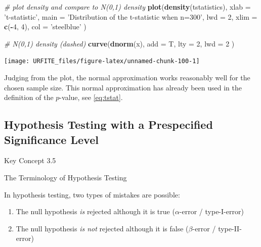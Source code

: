 \documentclass[]{book}
\newenvironment{Shaded}{\begin{snugshade}}{\end{snugshade}}
\newcommand{\KeywordTok}[1]{\textcolor[rgb]{0.13,0.29,0.53}{\textbf{#1}}}
\newcommand{\DataTypeTok}[1]{\textcolor[rgb]{0.13,0.29,0.53}{#1}}
\newcommand{\DecValTok}[1]{\textcolor[rgb]{0.00,0.00,0.81}{#1}}
\newcommand{\StringTok}[1]{\textcolor[rgb]{0.31,0.60,0.02}{#1}}
\newcommand{\CommentTok}[1]{\textcolor[rgb]{0.56,0.35,0.01}{\textit{#1}}}
\newcommand{\OperatorTok}[1]{\textcolor[rgb]{0.81,0.36,0.00}{\textbf{#1}}}
\newcommand{\NormalTok}[1]{#1}
\theoremstyle{definition}
\theoremstyle{definition}
\theoremstyle{definition}
\theoremstyle{remark}
\begin{document}
\begin{Shaded}
\begin{Highlighting}[]
\CommentTok{# plot density and compare to N(0,1) density}
\KeywordTok{plot}\NormalTok{(}\KeywordTok{density}\NormalTok{(tstatistics),}
     \DataTypeTok{xlab =} \StringTok{'t-statistic'}\NormalTok{,}
     \DataTypeTok{main =} \StringTok{'Distribution of the t-statistic when n=300'}\NormalTok{,}
     \DataTypeTok{lwd =} \DecValTok{2}\NormalTok{,}
     \DataTypeTok{xlim =} \KeywordTok{c}\NormalTok{(}\OperatorTok{-}\DecValTok{4}\NormalTok{, }\DecValTok{4}\NormalTok{),}
     \DataTypeTok{col =} \StringTok{'steelblue'}
\NormalTok{     )}

\CommentTok{# N(0,1) density (dashed)}
\KeywordTok{curve}\NormalTok{(}\KeywordTok{dnorm}\NormalTok{(x), }
      \DataTypeTok{add =}\NormalTok{ T, }
      \DataTypeTok{lty =} \DecValTok{2}\NormalTok{, }
      \DataTypeTok{lwd =} \DecValTok{2}
\NormalTok{      )}
\end{Highlighting}
\end{Shaded}

\begin{center}\texttt{[image: URFITE\_files/figure-latex/unnamed-chunk-100-1]} \end{center}

Judging from the plot, the normal approximation works reasonably well
for the chosen sample size. This normal approximation has already been
used in the definition of the \(p\)-value, see \eqref{eq:tstat}.

\subsection*{Hypothesis Testing with a Prespecified Significance
Level}\label{hypothesis-testing-with-a-prespecified-significance-level}

Key Concept 3.5

The Terminology of Hypothesis Testing

In hypothesis testing, two types of mistakes are possible:

\begin{enumerate}
\def\labelenumi{\arabic{enumi}.}
\item
  The null hypothesis \emph{is} rejected although it is true
  (\(\alpha\)-error / type-I-error)
\item
  The null hypothesis \emph{is not} rejected although it is false
  (\(\beta\)-error / type-II-error)
\end{enumerate}
\end{document}

